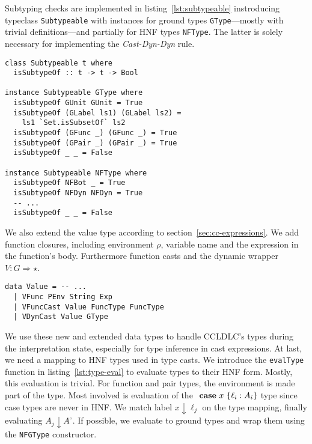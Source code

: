 Subtyping checks are implemented in listing~\ref{lst:subtypeable} instroducing typeclass \texttt{Subtypeable} with instances for ground types \texttt{GType}---mostly with trivial definitions---and partially for HNF types \texttt{NFType}. The latter is solely necessary for implementing the \emph{Cast-Dyn-Dyn} rule.

\begin{lstlisting}[float,
  label=lst:subtypeable,
  caption=Subtypeable typeclass (\texttt{ProcessEnvironment.hs})]
class Subtypeable t where
  isSubtypeOf :: t -> t -> Bool

instance Subtypeable GType where
  isSubtypeOf GUnit GUnit = True
  isSubtypeOf (GLabel ls1) (GLabel ls2) =
    ls1 `Set.isSubsetOf` ls2
  isSubtypeOf (GFunc _) (GFunc _) = True
  isSubtypeOf (GPair _) (GPair _) = True
  isSubtypeOf _ _ = False

instance Subtypeable NFType where
  isSubtypeOf NFBot _ = True
  isSubtypeOf NFDyn NFDyn = True
  -- ...
  isSubtypeOf _ _ = False
\end{lstlisting}

We also extend the value type according to section~\ref{sec:cc-expressions}. We add function closures, including environment $\rho$, variable name and the expression in the function's body. Furthermore function casts and the dynamic wrapper $V : G \Rightarrow \star$.

\begin{lstlisting}[caption=Value type extensions (\texttt{ProcessEnvironment.hs})]
data Value = -- ...
  | VFunc PEnv String Exp
  | VFuncCast Value FuncType FuncType
  | VDynCast Value GType
\end{lstlisting}

We use these new and extended data types to handle CCLDLC's types during the interpretation state, especially for type inference in cast expressions. At last, we need a mapping to HNF types used in type casts. We introduce the \texttt{evalType} function in listing~\ref{lst:type-eval} to evaluate types to their HNF form. Mostly, this evaluation is trivial. For function and pair types, the environment is made part of the type. Most involved is evaluation of the $\text{ \textbf{case} } x~\{\ell_i : A_i\}$ type since case types are never in HNF. We match label $x \downarrow \ell_j$ on the type mapping, finally evaluating $A_j \downarrow A^\circ$. If possible, we evaluate to ground types and wrap them using the \texttt{NFGType} constructor.

